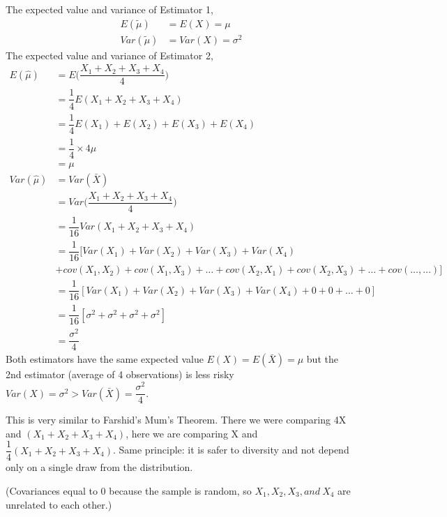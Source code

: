 \documentclass[12pt]{report}
\begin{document}
\noindent The expected value and variance of Estimator 1,
\begin{align*}
	E(\tilde{\mu}) &= E(X) = \mu \\
	Var(\tilde{\mu}) &= Var(X) = \sigma^2
\end{align*}
\noindent The expected value and variance of Estimator 2, 
\begin{align*}
E(\hat{\mu}) &= E\Big(\dfrac{X_1+X_2+X_3+X_4}{4}\Big) \\
&= \dfrac{1}{4}E(X_1+X_2+X_3+X_4) \\
&= \dfrac{1}{4} E(X_1)+E(X_2)+E(X_3)+E(X_4)\\
&= \dfrac{1}{4} \times 4\mu \\
&=\mu \\
Var(\hat{\mu}) &= Var(\bar{X}) \\
&= Var\Big(\dfrac{X_1+X_2+X_3+X_4}{4}\Big) \\
&=\dfrac{1}{16}Var(X_1+X_2+X_3+X_4) \\
&= \dfrac{1}{16}[Var(X_1)+Var(X_2)+Var(X_3)+Var(X_4) \\
&+cov(X_1,X_2)+cov(X_1,X_3)+\dots +cov(X_2,X_1)+cov(X_2,X_3)+\dots +cov(\dots,\dots)] \\
&= \dfrac{1}{16}[Var(X_1)+Var(X_2)+Var(X_3)+Var(X_4) + 0 + 0 + \dots + 0] \\
&= \dfrac{1}{16}[\sigma^2+\sigma^2+\sigma^2+\sigma^2] \\
&= \dfrac{\sigma^2}{4}
\end{align*}
\noindent Both estimators have the same expected value $E(X) = E(\bar{X}) = \mu$ but the 2nd estimator (average of 4 observations) is less risky $Var(X) = \sigma^2 > Var(\bar{X}) = \dfrac{\sigma^2}{4}$.

\noindent This is very similar to Farshid's Mum's Theorem. There we were comparing 4X and $(X_1+X_2+X_3+X_4)$, here we are comparing X and $\dfrac{1}{4}(X_1+X_2+X_3+X_4)$. Same principle: it is safer to diversity and not depend only on a single draw from the distribution.

\noindent (Covariances equal to 0 because the sample is random, so $X_1, X_2, X_3, and\ X_4$ are unrelated to each other.)

\end{document}
